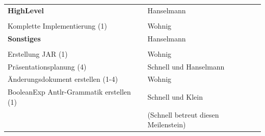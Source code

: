 \documentclass[a4paper]{scrreprt}
\begin{document}
\begin{tabular}{ | p{7cm} | p{7cm} |}
	\rule{0pt}{15pt}\textbf {HighLevel} & Hanselmann\\
	&\\
	\hline
	Komplette Implementierung (1) & Wohnig\\
	\hline
	
	\rule{0pt}{15pt}\textbf {Sonstiges} & Hanselmann\\
	&\\
	\hline
	Erstellung JAR (1) & Wohnig \\
	\hline
	Präsentationsplanung (4) & Schnell und Hanselmann  \\
	\hline
	Änderungsdokument erstellen (1-4) & Wohnig \\
	\hline
	BooleanExp Antlr-Grammatik erstellen (1) & Schnell und Klein \\
	& (Schnell betreut diesen Meilenstein) \\
	\hline
	
    \end{tabular}\\\\
\end{document}
